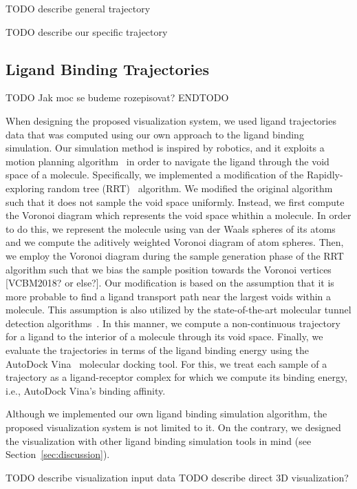 \documentclass{vgtc}                          %
\begin{document}
TODO describe general trajectory

TODO describe our specific trajectory

\subsection{Ligand Binding Trajectories}

TODO Jak moc se budeme rozepisovat? ENDTODO

When designing the proposed visualization system, we used ligand trajectories data that was computed using our own approach to the ligand binding simulation.
Our simulation method is inspired by robotics, and it exploits a motion planning algorithm~\cite{lavalle2006planning} in order to navigate the ligand through the void space of a molecule.
Specifically, we implemented a modification of the Rapidly-exploring random tree (RRT)~\cite{lavalle1998rapidly} algorithm.
We modified the original algorithm such that it does not sample the void space uniformly.
Instead, we first compute the Voronoi diagram which represents the void space whithin a molecule.
In order to do this, we represent the molecule using van der Waals spheres of its atoms and we compute the aditively weighted Voronoi diagram of atom spheres.
Then, we employ the Voronoi diagram during the sample generation phase of the RRT algorithm such that we bias the sample position towards the Voronoi vertices [VCBM2018? or else?].
Our modification is based on the assumption that it is more probable to find a ligand transport path near the largest voids within a molecule.
This assumption is also utilized by the state-of-the-art molecular tunnel detection algorithms~\cite{yaffe2008molaxis, chovancova2012caver, sehnal2013mole}.
In this manner, we compute a non-continuous trajectory for a ligand to the interior of a molecule through its void space.
Finally, we evaluate the trajectories in terms of the ligand binding energy using the AutoDock Vina~\cite{trott2010autodock} molecular docking tool.
For this, we treat each sample of a trajectory as a ligand-receptor complex for which we compute its binding energy, i.e., AutoDock Vina's binding affinity.

Although we implemented our own ligand binding simulation algorithm, the proposed visualization system is not limited to it.
On the contrary, we designed the visualization with other ligand binding simulation tools in mind (see Section~\ref{sec:discussion}).

TODO describe visualization input data
TODO describe direct 3D visualization?
\end{document}
